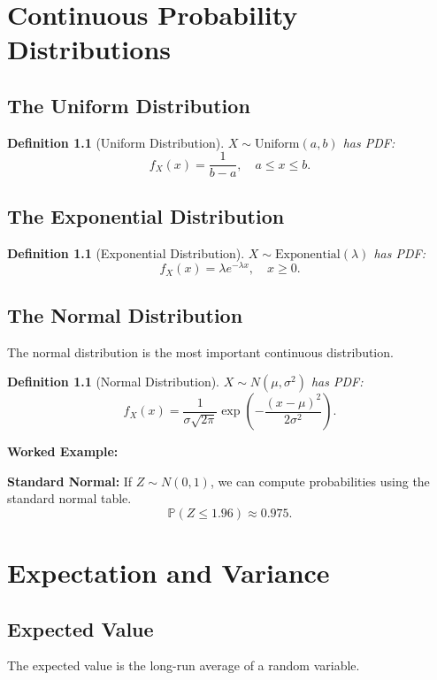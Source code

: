 \documentclass[12pt,a4paper,oneside]{report}
\theoremstyle{mytheorem}
\theoremstyle{mydefinition}
\newtheorem{definition}[theorem]{Definition}
\theoremstyle{myremark}
\newenvironment{worked}{%
  \par\medskip\noindent\textbf{\color{myorange}Worked Example:}\par\smallskip
}{%
  \par\medskip
}
\newcommand{\Prob}{\mathbb{P}}
\begin{document}
\chapter{Continuous Probability Distributions}

\section{The Uniform Distribution}
\begin{definition}[Uniform Distribution]
$X \sim \text{Uniform}(a,b)$ has PDF:
\[
f_X(x) = \frac{1}{b-a}, \quad a \le x \le b.
\]
\end{definition}

\section{The Exponential Distribution}
\begin{definition}[Exponential Distribution]
$X \sim \text{Exponential}(\lambda)$ has PDF:
\[
f_X(x) = \lambda e^{-\lambda x}, \quad x \ge 0.
\]
\end{definition}

\section{The Normal Distribution}
The normal distribution is the most important continuous distribution.

\begin{definition}[Normal Distribution]
$X \sim N(\mu, \sigma^2)$ has PDF:
\[
f_X(x) = \frac{1}{\sigma \sqrt{2\pi}} \exp\left(-\frac{(x-\mu)^2}{2\sigma^2}\right).
\]
\end{definition}

\begin{worked}
\textbf{Standard Normal:}
If $Z \sim N(0,1)$, we can compute probabilities using the standard normal table.
\[
\Prob(Z \le 1.96) \approx 0.975.
\]
\end{worked}

\chapter{Expectation and Variance}

\section{Expected Value}
The expected value is the long-run average of a random variable.
\end{document}
